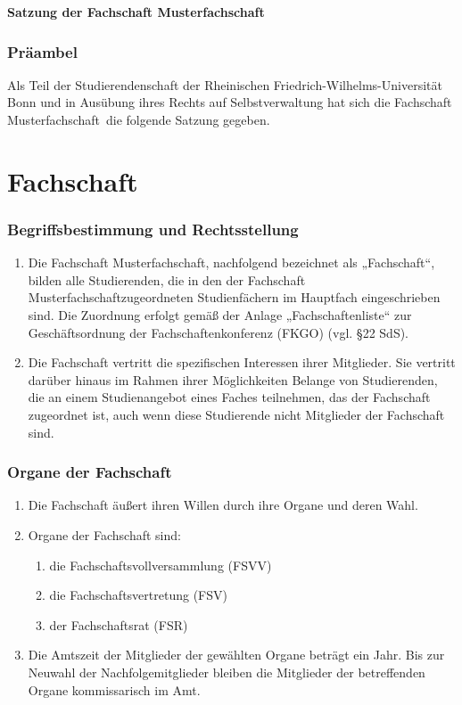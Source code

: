 \documentclass{article}
\newcommand{\fachschaft}{Musterfachschaft}
\begin{document}
\noindent
\begin{center}
    \huge \textbf{Satzung der Fachschaft \linebreak[1] \fachschaft} \\
    \large {}
\end{center}

\section*{Präambel}
\noindent
Als Teil der Studierendenschaft der Rheinischen Friedrich-Wilhelms-Universität Bonn und in Ausübung ihres Rechts auf Selbstverwaltung hat sich die Fachschaft \fachschaft\ die
folgende Satzung gegeben.
 

\part{Fachschaft}
\section{Begriffsbestimmung und Rechtsstellung}
\begin{enumerate}[(1)]
\item Die Fachschaft \fachschaft , nachfolgend bezeichnet als „Fachschaft“, bilden alle Studierenden, die in den der Fachschaft \fachschaft zugeordneten Studienfächern im Hauptfach eingeschrieben sind. Die Zuordnung erfolgt gemäß der Anlage „Fachschaftenliste“ zur Geschäftsordnung der Fachschaftenkonferenz (FKGO) (vgl. §22 SdS).
\item Die Fachschaft vertritt die spezifischen Interessen ihrer Mitglieder. Sie vertritt darüber hinaus im Rahmen ihrer Möglichkeiten Belange von Studierenden, die an einem Studienangebot eines Faches teilnehmen, das der Fachschaft zugeordnet ist, auch wenn diese Studierende nicht Mitglieder der Fachschaft sind.
\end{enumerate}

\section{Organe der Fachschaft}
\begin{enumerate}[(1)]
\item Die Fachschaft äußert ihren Willen durch ihre Organe und deren Wahl.
\item Organe der Fachschaft sind:
\begin{enumerate}[1.]
    \item die Fachschaftsvollversammlung (FSVV)
    \item die Fachschaftsvertretung (FSV)
    \item der Fachschaftsrat (FSR)
\end{enumerate}
\item Die Amtszeit der Mitglieder der gewählten Organe beträgt ein Jahr. Bis zur Neuwahl der Nachfolgemitglieder bleiben die Mitglieder der betreffenden Organe kommissarisch im Amt.
\end{enumerate}
\end{document}
